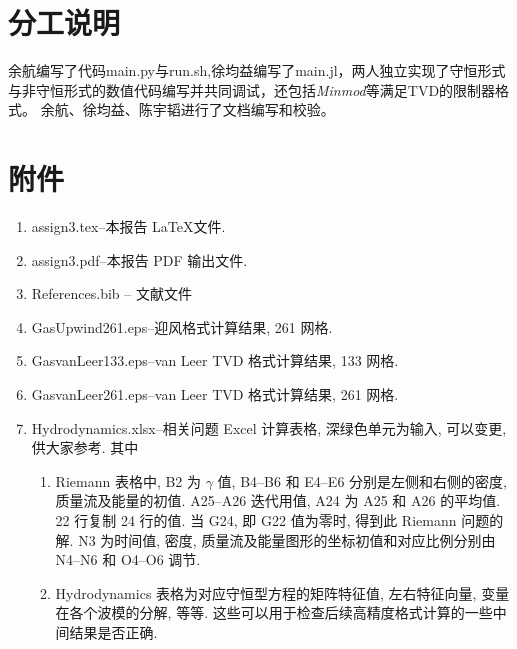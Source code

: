 \documentclass[10.5pt
]{article}
\begin{document}
\section{分工说明}
余航编写了代码main.py与run.sh,徐均益编写了main.jl，两人独立实现了守恒形式与非守恒形式的数值代码编写并共同调试，还包括\textit{Minmod}等满足TVD的限制器格式。
 余航、徐均益、陈宇韬进行了文档编写和校验。
\section{附件}

\begin{enumerate}
\item
assign3.tex--本报告 \LaTeX  文件.
\item
assign3.pdf--本报告 PDF 输出文件.
\item
References.bib -- 文献文件
\item
GasUpwind261.eps--迎风格式计算结果, 261 网格.
\item
GasvanLeer133.eps--van Leer TVD 格式计算结果, 133 网格.
\item
GasvanLeer261.eps--van Leer TVD 格式计算结果, 261 网格.
\item
Hydrodynamics.xlsx--相关问题 Excel 计算表格, 深绿色单元为输入, 可以变更, 供大家参考. 其中
\begin{enumerate}
\item
  Riemann 表格中, B2 为 $\gamma$ 值, B4--B6 和 E4--E6 分别是左侧和右侧的密度, 质量流及能量的初值. A25--A26 迭代用值, A24 为 A25 和 A26 的平均值.
  22 行复制 24 行的值. 当 G24, 即 G22 值为零时, 得到此 Riemann 问题的解. N3 为时间值, 密度, 质量流及能量图形的坐标初值和对应比例分别由 N4--N6 和 O4--O6 调节.
\item
Hydrodynamics 表格为对应守恒型方程的矩阵特征值, 左右特征向量, 变量在各个波模的分解, 等等. 这些可以用于检查后续高精度格式计算的一些中间结果是否正确.
\end{enumerate}
\end{enumerate}



\end{document}

